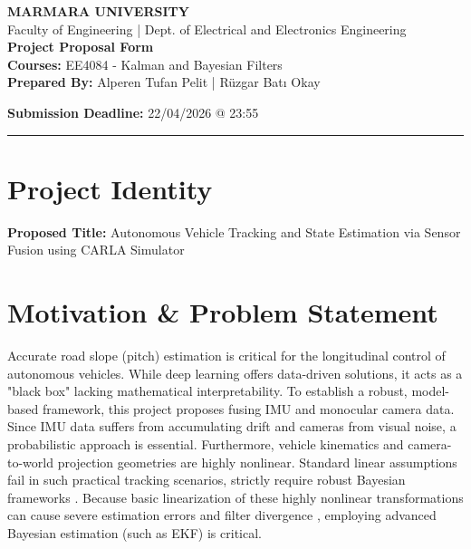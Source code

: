 \documentclass[12pt]{article}
\begin{document}
\begin{center}
    \textbf{MARMARA UNIVERSITY} \\
    Faculty of Engineering | Dept. of Electrical and Electronics Engineering \\
    \vspace{1em}
    {\huge \textcolor{marmara_blue}{\textbf{Project Proposal Form}}} \\
    \vspace{0.5em}
    \large \textbf{Courses:} EE4084 - Kalman and Bayesian Filters \\ 
    \vspace{0.5em}
    \textbf{Prepared By:} Alperen Tufan Pelit |
    Rüzgar Batı Okay
    
    \textbf{Submission Deadline:} 22/04/2026 @ 23:55
\end{center}

\hrule \vspace{1.5em}

\section{Project Identity}
\textbf{Proposed Title:} Autonomous Vehicle Tracking and State Estimation via Sensor Fusion using CARLA Simulator \\

\section{Motivation \& Problem Statement}
Accurate road slope (pitch) estimation is critical for the longitudinal control of autonomous vehicles. While deep learning offers data-driven solutions, it acts as a "black box" lacking mathematical interpretability. To establish a robust, model-based framework, this project proposes fusing IMU and monocular camera data.\\

Since IMU data suffers from accumulating drift and cameras from visual noise, a probabilistic approach is essential. Furthermore, vehicle kinematics and camera-to-world projection geometries are highly nonlinear. Standard linear assumptions fail in such practical tracking scenarios, strictly require robust Bayesian frameworks \cite{pf_tutorial_2002}. Because basic linearization of these highly nonlinear transformations can cause severe estimation errors and filter divergence \cite{Julier:pIEEE04}, employing advanced Bayesian estimation (such as EKF) is critical.\\
\end{document}

